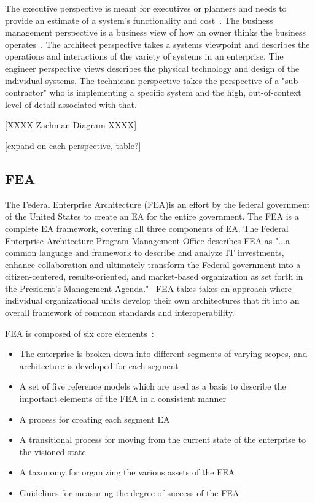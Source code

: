The executive perspective is meant for executives or planners and needs to provide an estimate of a system's functionality and cost~\cite{jungle2004}. The business management perspective is a business view of how an owner thinks the business operates~\cite{Zachman2000}. The architect perspective takes a systems viewpoint and describes the operations and interactions of the variety of systems in an enterprise. The engineer perspective views describes the physical technology and design of the individual systems. The technician perspective takes the perspective of a "sub-contractor" who is implementing a specific system and the high, out-of-context level of detail associated with that.
 
[XXXX Zachman Diagram XXXX]

[expand on each perspective, table?]

\subsection{FEA}
The Federal Enterprise Architecture (FEA)is an effort by the federal government of the United States to create an EA for the entire government. The FEA is a complete EA framework, covering all three components of EA. The Federal Enterprise Architecture Program Management Office describes FEA as "...a common language and framework to describe and analyze IT investments, enhance collaboration and ultimately transform the Federal government into a citizen-centered, results-oriented, and market-based organization as set forth in the President's Management Agenda."~\cite{FederalEnterpriseArchitectureProgramManagementOffice} FEA takes takes an approach where individual organizational units develop their own architectures that fit into an overall framework of common standards and interoperability.

FEA is composed of six core elements~\cite{sessions2007}:
\begin{itemize}
    \item The enterprise is broken-down into different segments of varying scopes, and architecture is developed for each segment
    \item A set of five reference models which are used as a basis to describe the important elements of the FEA in a consistent manner
    \item A process for creating each segment EA
    \item A transitional process for moving from the current state of the enterprise to the visioned state
    \item A taxonomy for organizing the various assets of the FEA
    \item Guidelines for measuring the degree of success of the FEA
\end{itemize}

